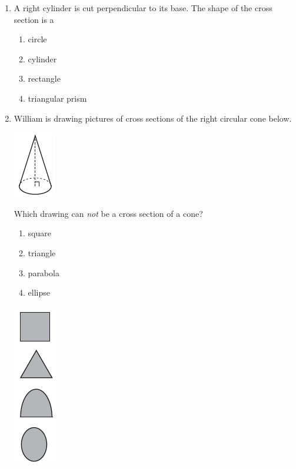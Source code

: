 \documentclass[12pt, oneside]{article}
\begin{document}
\begin{enumerate}[itemsep=0cm]
\item  %
A right cylinder is cut perpendicular to its base. The shape of the cross section is a
  \begin{multicols}{2}
    \begin{enumerate}
      \item circle
      \item cylinder
      \item rectangle
      \item triangular prism
    \end{enumerate}
  \end{multicols}

\item William is drawing pictures of cross sections of the right circular cone below.
  \begin{center}
    \includegraphics[]{cone.png}
  \end{center}
    Which drawing can \emph{not} be a cross section of a cone?
    \begin{multicols}{2}
    \begin{enumerate}
    \item square
    \item triangle
    \item parabola
    \item ellipse
    \end{enumerate}
    \includegraphics[scale=0.7]{cone-sections.png}
  \end{multicols}


\end{enumerate}
\end{document}
